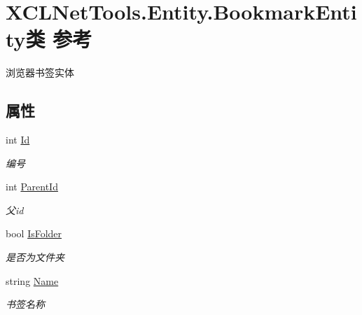 \hypertarget{class_x_c_l_net_tools_1_1_entity_1_1_bookmark_entity}{\section{X\-C\-L\-Net\-Tools.\-Entity.\-Bookmark\-Entity类 参考}
\label{class_x_c_l_net_tools_1_1_entity_1_1_bookmark_entity}
}


浏览器书签实体  


\subsection*{属性}
\begin{DoxyCompactItemize}
\item 
int \hyperlink{class_x_c_l_net_tools_1_1_entity_1_1_bookmark_entity_a827314c81aad0801f464f7359509baec}{Id}
\begin{DoxyCompactList}\small\item\em 编号 \end{DoxyCompactList}\item 
int \hyperlink{class_x_c_l_net_tools_1_1_entity_1_1_bookmark_entity_afd3c2002aa8d5edeac06f6ef32ba7454}{Parent\-Id}
\begin{DoxyCompactList}\small\item\em 父id \end{DoxyCompactList}\item 
bool \hyperlink{class_x_c_l_net_tools_1_1_entity_1_1_bookmark_entity_a025f1606c5b38103058567b3e08afe03}{Is\-Folder}
\begin{DoxyCompactList}\small\item\em 是否为文件夹 \end{DoxyCompactList}\item 
string \hyperlink{class_x_c_l_net_tools_1_1_entity_1_1_bookmark_entity_a89ccb517e285bfdd17981a72f590bc1c}{Name}
\begin{DoxyCompactList}\small\item\em 书签名称 \end{DoxyCompactList}\item 

\end{DoxyCompactItemize}
